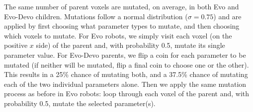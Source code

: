 

The same number of parent voxels are mutated, on average, in both Evo and Evo-Devo children.
Mutations follow a normal distribution ($\sigma=0.75$) and are applied by first choosing what parameter types to mutate, and then choosing which voxels to mutate.
For Evo robots, we simply visit each voxel (on the positive $x$ side) of the parent and, with probability 0.5, mutate its single parameter value.
For Evo-Devo parents, we flip a coin for each parameter to be mutated (if neither will be mutated, flip a final coin to choose one or the other).  
This results in a 25\% chance of mutating both, and a 37.5\% chance of mutating each of the two individual parameters alone.
Then we apply the same mutation process as before in Evo robots: loop through each voxel of the parent and, with probability 0.5, mutate the selected parameter(s).


